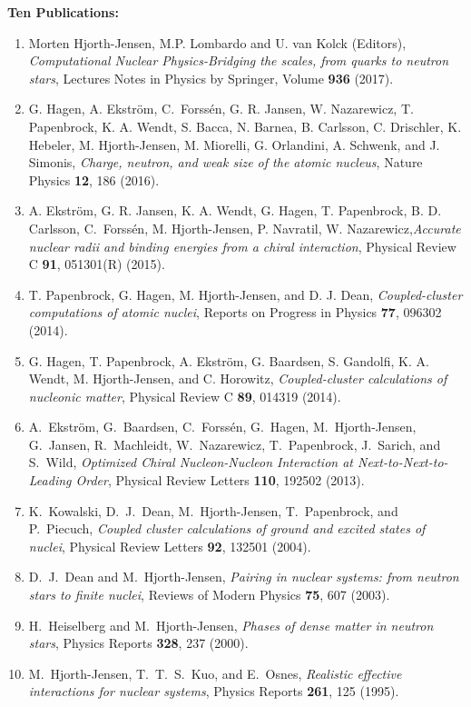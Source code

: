 \documentclass[10pt,a4wide]{revtex4-1}
\begin{document}
\noindent
{\bf Ten Publications:}
\vspace*{-8pt}

\begin{enumerate}

\item Morten Hjorth-Jensen, M.P. Lombardo and U. van Kolck (Editors), {\em Computational Nuclear Physics-Bridging the scales, from quarks to neutron stars}, Lectures Notes in Physics by Springer, Volume {\bf 936} (2017).


\item  G. Hagen, A. Ekstr\"om, C.\ Forss\'en, G. R. Jansen, W. Nazarewicz, T. Papenbrock, K. A. Wendt, S. Bacca, N. Barnea, B. Carlsson, C. Drischler, K. Hebeler, M. Hjorth-Jensen, M. Miorelli, G. Orlandini, A. Schwenk, and J. Simonis, {\em Charge, neutron, and weak size of the atomic nucleus}, Nature Physics {\bf 12}, 186 (2016).


\item  A. Ekstr\"om, G. R. Jansen, K. A. Wendt, G. Hagen, T. Papenbrock, B. D. Carlsson, C.\ Forss\'en, M. Hjorth-Jensen, P. Navratil, W. Nazarewicz,{\em Accurate nuclear radii and binding energies from a chiral interaction}, Physical Review C {\bf 91}, 051301(R) (2015).


\item T. Papenbrock, G. Hagen, M. Hjorth-Jensen, and D. J. Dean, {\em Coupled-cluster computations of atomic nuclei}, Reports on Progress in Physics {\bf 77}, 096302 (2014).

\item G. Hagen, T. Papenbrock, A. Ekstr\"om, G. Baardsen, S. Gandolfi, K. A. Wendt, M. Hjorth-Jensen, and C. Horowitz, {\em Coupled-cluster calculations of nucleonic matter}, Physical Review C {\bf 89}, 014319 (2014).


\item A.~Ekstr\"om, G.\ Baardsen, C.\ Forss\'en, G.\ Hagen, M.\	Hjorth-Jensen, G.\ Jansen, R.\ Machleidt, W.\ Nazarewicz, 
 T.\ Papenbrock, J.\ Sarich, and S.\ Wild, {\em Optimized Chiral Nucleon-Nucleon Interaction at Next-to-Next-to-Leading Order}, Physical Review Letters {\bf 110}, 192502 (2013).


\item
K.\ Kowalski, D.~J.\ Dean, M.\ Hjorth-Jensen, T.\ Papenbrock, and
  P.\ Piecuch, {\em Coupled cluster calculations of ground and excited states of nuclei}, Physical  Review Letters {\bf 92}, 132501 (2004).

\item
D.~J.\ Dean and M.\ Hjorth-Jensen, {\em Pairing in nuclear systems: from neutron stars to finite nuclei},  Reviews of Modern Physics {\bf 75}, 607 (2003).


\item
H.\ Heiselberg and M.\ Hjorth-Jensen, {\em Phases of dense matter in neutron stars}, Physics Reports {\bf 328}, 237 (2000).

\item
M.\ Hjorth-Jensen, T.~T.\ S.\ Kuo, and E.\ Osnes, {\em Realistic effective interactions for nuclear systems}, Physics Reports {\bf 261}, 125 (1995).


\end{enumerate}
\end{document}
